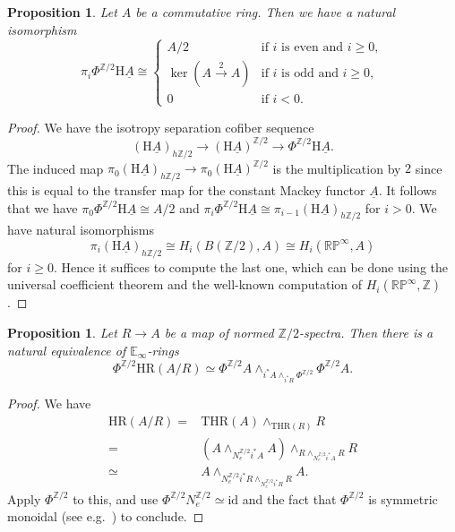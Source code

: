 \documentclass[10pt]{amsart}
\newtheorem{prop}[thm]{Proposition}
\theoremstyle{definition}
\numberwithin{equation}{section}
\newcommand{\E}{\mathbb{E}}
\renewcommand{\P}{\mathbb{P}}
\newcommand{\R}{\mathbb{R}}
\newcommand{\Z}{\mathbb{Z}}
\newcommand{\rH}{\mathrm{H}}
\newcommand{\ul}{\underline}
\newcommand{\id}{\mathrm{id}}
\newcommand{\HR}{\mathrm{HR}}
\newcommand{\THR}{\mathrm{THR}}
\begin{document}
{\begin{prop}
\label{geometric.1}
Let $A$ be a commutative ring.
Then we have a natural isomorphism
\[
\pi_i \Phi^{\Z/2}\rH \ul{A}
\cong
\left\{
\begin{array}{ll}
A/2 & \text{if $i$ is even and $i\geq 0$},\\
\ker(A\xrightarrow{2} A) & \text{if $i$ is odd and $i\geq 0$},
\\
0 &\text{if $i<0$}.
\end{array}
\right.
\]
\end{prop}
\begin{proof}
We have the isotropy separation cofiber sequence
\[
(\rH \ul{A})_{h\Z/2}
\to
(\rH \ul{A})^{\Z/2}
\to
\Phi^{\Z/2} \rH \ul{A}.
\]
The induced map $\pi_0 (\rH \ul{A})_{h\Z/2}\to \pi_0 (\rH \ul{A})^{\Z/2}$ is the multiplication by $2$ since this is equal to the transfer map for the constant Mackey functor $\ul{A}$.
It follows that we have $\pi_0\Phi^{\Z/2}\rH \ul{A}\cong A/2$ and $\pi_i\Phi^{\Z/2}\rH \ul{A}\cong \pi_{i-1}(\rH \ul{A})_{h\Z/2}$ for $i>0$.
We have natural isomorphisms
\[
\pi_i (\rH \ul{A})_{h\Z/2}
\cong
H_i (B (\Z/2),A)
\cong
H_i(\R \P^\infty, A)
\]
for $i\geq 0$.
Hence it suffices to compute the last one, which can be done using the universal coefficient theorem and the well-known computation of $H_i(\R\P^\infty,\Z)$.
\end{proof}



\begin{prop}
\label{geometric.2}
Let $R\to A$ be a map of normed $\Z/2$-spectra.
Then there is a natural equivalence of $\E_\infty$-rings
\[
\Phi^{\Z/2}\HR(A/R)
\simeq
\Phi^{\Z/2}A\wedge_{i^*A\wedge_{i^*R} \Phi^{\Z/2}}\Phi^{\Z/2}A.
\]
\end{prop}
\begin{proof}
We have
\begin{align*}
\HR(A/R)
= &
\THR(A)\wedge_{\THR(R)} R
\\
= &
(A\wedge_{N_e^{\Z/2}i^*A} A)\wedge_{R\wedge_{N_e^{\Z/2}i^*A}R} R
\\
\simeq &
A\wedge_{N_e^{\Z/2}i^*R\wedge_{N_e^{\Z/2}i^*R}R} A.
\end{align*}
Apply $\Phi^{\Z/2}$ to this,
and use $\Phi^{\Z/2}N_e^{\Z/2}\simeq \id$ and the fact that $\Phi^{\Z/2}$ is symmetric monoidal (see e.g.\ \cite[Remark 9.10]{BH21}) to conclude.
\end{proof}

}
\end{document}
